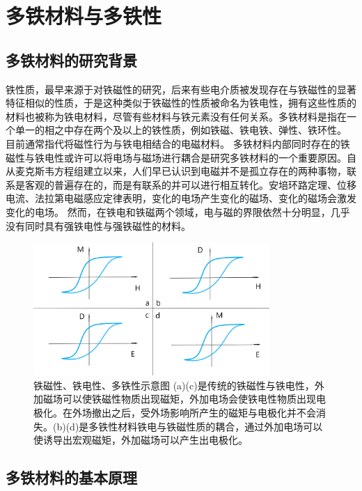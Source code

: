 \chapter{多铁材料与多铁性}


\section{多铁材料的研究背景}

铁性质，最早来源于对铁磁性的研究，后来有些电介质被发现存在与铁磁性的显著特征相似的性质，于是这种类似于铁磁性的性质被命名为铁电性，拥有这些性质的材料也被称为铁电材料，尽管有些材料与铁元素没有任何关系。多铁材料是指在一个单一的相之中存在两个及以上的铁性质，例如铁磁、铁电铁、弹性、铁环性。\cite{eerenstein2006multiferroic} 目前通常指代将磁性行为与铁电相结合的电磁材料。\cite{spaldin2019advances} 多铁材料内部同时存在的铁磁性与铁电性或许可以将电场与磁场进行耦合是研究多铁材料的一个重要原因。自从麦克斯韦方程组建立以来，人们早已认识到电磁并不是孤立存在的两种事物，联系是客观的普遍存在的，而是有联系的并可以进行相互转化。安培环路定理、位移电流、法拉第电磁感应定律表明，变化的电场产生变化的磁场、变化的磁场会激发变化的电场。\cite{刘俊明2019多铁性} 然而，在铁电和铁磁两个领域，电与磁的界限依然十分明显，几乎没有同时具有强铁电性与强铁磁性的材料。

\begin{figure}[h]
    \centering
\includegraphics[width=0.8\textwidth]{./pic/003.png}
\caption{铁磁性、铁电性、多铁性示意图  (a)(c)是传统的铁磁性与铁电性，外加磁场可以使铁磁性物质出现磁矩，外加电场会使铁电性物质出现电极化。在外场撤出之后，受外场影响所产生的磁矩与电极化并不会消失。(b)(d)是多铁性材料铁电与铁磁性质的耦合，通过外加电场可以使诱导出宏观磁矩，外加磁场可以产生出电极化。}

\label{dog003}
\end{figure}

\section{多铁材料的基本原理}

